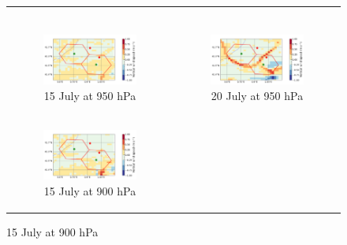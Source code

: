 \begin{figure}[hbtp]
\begin{tabular}{cc}
\begin{subfigure}[t]{0.5\textwidth}
        \end{subfigure} \\
        \begin{subfigure}[t]{0.5\textwidth}
            \caption{15 July at 950 hPa}
            \includegraphics[width=\textwidth]{images/chap6/IOP_maps/mesoNH_vertwind_950_2021-07-15T12:00:00.png}
        \end{subfigure} &
        \begin{subfigure}[t]{0.5\textwidth}
            \caption{20 July at 950 hPa}
            \includegraphics[width=\textwidth]{images/chap6/IOP_maps/mesoNH_vertwind_950_2021-07-20T12:00:00.png}
        \end{subfigure} \\
        \begin{subfigure}[t]{0.5\textwidth}
            \caption{15 July at 900 hPa}
            \includegraphics[width=\textwidth]{images/chap6/IOP_maps/mesoNH_vertwind_900_2021-07-15T12:00:00.png}

\end{subfigure}
\end{tabular}
\end{figure}
